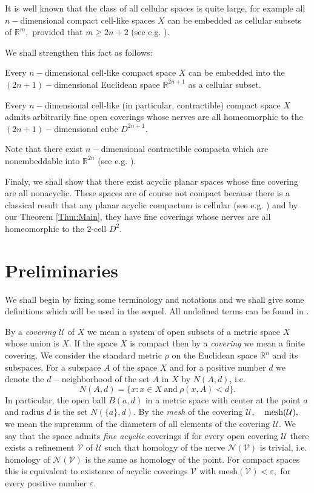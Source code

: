 It is well known that the class of all cellular spaces is quite
large, for example all $n-$dimensional compact cell-like spaces
$X$ can be embedded as cellular subsets of $\mathbb{R}^m,$
provided that $m \geq 2n + 2$ (see e.g. \cite{GS}).

We shall strengthen this fact as follows:
\begin{thm}\label{Thm:Main2}
Every $n-$dimensional cell-like compact space $X$ can be embedded
into
the $(2n+1)-$dimensional Euclidean space
$\mathbb{R}^{2n+1}$
as a cellular subset.
\end{thm}

\begin{cor}\label{contractible}
Every $n-$dimensional cell-like (in particular, contractible)
compact space $X$ admits arbitrarily fine open coverings whose
nerves are all homeomorphic to
the $(2n+1)-$dimensional cube
$D^{2n+1}.$
\end{cor}

Note that there exist $n-$dimensional contractible compacta which
are nonembeddable into $\mathbb{R}^{2n}$ (see e.g.
\cite{KaRe2001}).

Finaly, we shall show that there exist acyclic planar spaces whose
fine covering are all nonacyclic. These spaces are of course not
compact because there is a classical result that any planar
acyclic compactum is cellular (see  e.g. \cite{B,D,M}) and by our Theorem \ref{Thm:Main}, they have fine
coverings whose nerves are all homeomorphic to the $2$-cell $D^2$.

\section{Preliminaries}

We shall begin by fixing some terminology and notations and we
shall give some definitions which will be used in the sequel. All
undefined terms can be found in \cite{B,D,E,H,HW,
SeTh,SE}.

By a {\it covering} $\mathcal{U}$ of $X$ we mean a system of open
subsets of a metric space $X$ whose union  is $X$. If the
space $X$ is compact then by a {\it covering} we mean a finite covering.
We consider the standard metric $\rho$ on the Euclidean space
$\mathbb{R}^n$ and its subspaces. For a subspace $A$ of the space
$X$ and for a positive number $d$  we denote the $d-$neighborhood
of the set $A$ in $X$ by $N(A, d)$, i.e. $$N(A, d) = \{x: x\in X \
\mbox{and}\  \rho(x, A) < d\}.$$ In particular, the open ball
$B(a, d)$ in a metric space with center at the point $a$ and
radius $d$ is the set $N(\{a\}, d)$. By the {\it mesh} of the
covering $\mathcal{U},$\ \ ${\rm mesh}(\mathcal{U}),$ we mean the
supremum of the diameters of all elements of the covering
$\mathcal{U}$. We say that the space admits {\it  fine acyclic}
coverings if for every open covering $\mathcal{U}$ there exists a
refinement $\mathcal{V}$ of $\mathcal{U}$ such that homology of
the nerve $\mathcal{N}(\mathcal{V})$ is trivial, i.e. homology of
$\mathcal{N}(\mathcal{V})$ is the same as homology of the point.
For compact spaces this is equivalent to existence of acyclic
coverings $\mathcal{V}$ with mesh$(\mathcal{V}) < \varepsilon,$
for every positive number $\varepsilon$.

